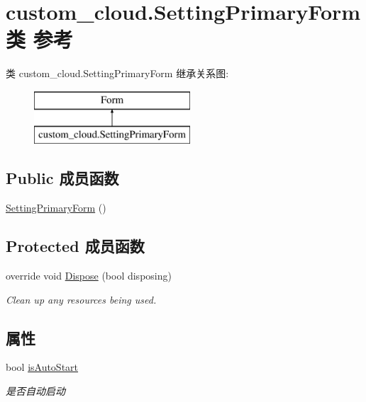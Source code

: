 \hypertarget{classcustom__cloud_1_1_setting_primary_form}{}\section{custom\+\_\+cloud.\+Setting\+Primary\+Form类 参考}
\label{classcustom__cloud_1_1_setting_primary_form}
类 custom\+\_\+cloud.\+Setting\+Primary\+Form 继承关系图\+:\begin{figure}[H]
\begin{center}
\leavevmode
\includegraphics[height=2.000000cm]{classcustom__cloud_1_1_setting_primary_form}
\end{center}
\end{figure}
\subsection*{Public 成员函数}
\begin{DoxyCompactItemize}
\item 
\hyperlink{classcustom__cloud_1_1_setting_primary_form_a98bd28602383c683c9b5a4643eddbeba}{Setting\+Primary\+Form} ()
\end{DoxyCompactItemize}
\subsection*{Protected 成员函数}
\begin{DoxyCompactItemize}
\item 
override void \hyperlink{classcustom__cloud_1_1_setting_primary_form_a60589ffc5415019928d44744ce154166}{Dispose} (bool disposing)
\begin{DoxyCompactList}\small\item\em Clean up any resources being used. \end{DoxyCompactList}\end{DoxyCompactItemize}
\subsection*{属性}
\begin{DoxyCompactItemize}
\item 
bool \hyperlink{classcustom__cloud_1_1_setting_primary_form_a26c7f21a43f8c27d9a9b78b7b9675b98}{is\+Auto\+Start}
\begin{DoxyCompactList}\small\item\em 是否自动启动 \end{DoxyCompactList}\end{DoxyCompactItemize}


